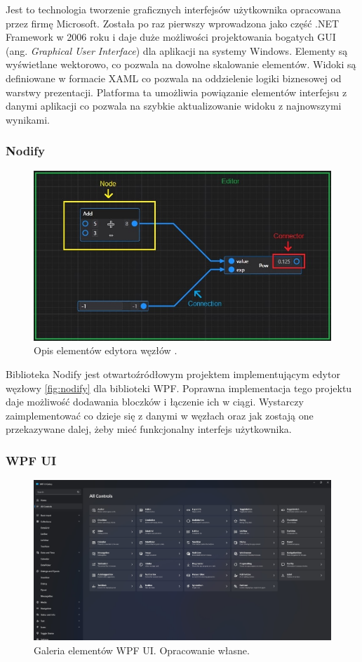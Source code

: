 Jest to technologia tworzenie graficznych interfejsów użytkownika opracowana przez firmę Microsoft. 
Została po raz pierwszy wprowadzona jako część .NET Framework w 2006 roku \cite{wpfHistory} i daje duże możliwości projektowania bogatych GUI (ang. \textit{Graphical User Interface}) dla aplikacji na systemy Windows.
Elementy są wyświetlane wektorowo, co pozwala na dowolne skalowanie elementów. 
Widoki są definiowane w formacie XAML co pozwala na oddzielenie logiki biznesowej od warstwy prezentacji.
Platforma ta umożliwia powiązanie elementów interfejsu z danymi aplikacji co pozwala na szybkie aktualizowanie widoku z najnowszymi wynikami.

\subsubsection{Nodify}
\begin{figure}[H]
    \centering
    \includegraphics[width=0.8\linewidth]{./images/Picture7.jpg}
    \caption{Opis elementów edytora węzłów \cite{node}.}
    \label{fig:nodify}
\end{figure}

Biblioteka Nodify \cite{nodify} jest otwartoźródłowym projektem implementującym edytor węzłowy \autoref{fig:nodify} dla biblioteki WPF. 
Poprawna implementacja tego projektu daje możliwość dodawania bloczków i łączenie ich w ciągi. 
Wystarczy zaimplementować co dzieje się z danymi w węzłach oraz jak zostają one przekazywane dalej, żeby mieć funkcjonalny interfejs użytkownika. 

\subsubsection{WPF UI}
\begin{figure}[H]
    \centering
    \includegraphics[width=0.9\linewidth]{./images/Picture8.jpg}
    \caption{Galeria elementów WPF UI. Opracowanie własne.}
    \label{fig:wpfui}
\end{figure}


